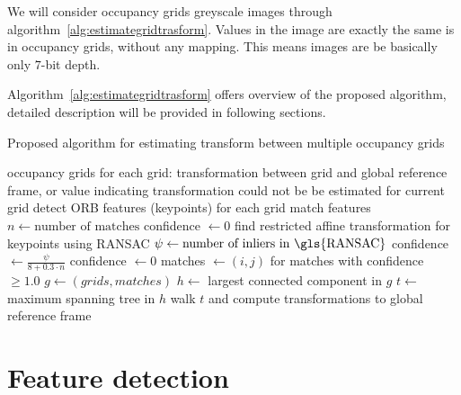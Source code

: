 We will consider occupancy grids greyscale images through algorithm~\ref{alg:estimategridtrasform}. Values in the image are exactly the same is in occupancy grids, without any mapping. This means images are be basically only $7$-bit depth.

Algorithm~\ref{alg:estimategridtrasform} offers overview of the proposed algorithm, detailed description will be provided in following sections.

\begin{algorithm}
    \caption{Proposed algorithm for estimating transform between multiple occupancy grids}
    \label{alg:estimategridtrasform}
    \begin{algorithmic}[1]
        \Require occupancy grids
        \Ensure for each grid: transformation between grid and global reference frame, or value indicating transformation could not be be estimated for current grid
            \State detect \gls{ORB} features (keypoints) for each grid
             
            	\State match features
            	\State $n \gets \text{number of matches}$
            		\State confidence $\gets 0$
            	\Else
            		\State find restricted affine transformation for keypoints using \gls{RANSAC}
            		\State $\psi \gets \text{number of inliers in \gls{RANSAC}}$
            			\State confidence $\gets \frac{\psi}{8 + 0.3 \cdot n}$
            		\Else
            			\State confidence $\gets 0$
            		\EndIf
            	\EndIf
            \EndFor
            \State matches $\gets (i,j)$ for matches with confidence $\ge 1.0$
            \State $g \gets (grids, matches)$
            \State $h \gets$ largest connected component in $g$
            \State $t \gets$ maximum spanning tree in $h$
            \State walk $t$ and compute transformations to global reference frame
        \EndProcedure
    \end{algorithmic}
\end{algorithm}


\section{Feature detection} %
\label{sec:feature_detection}

